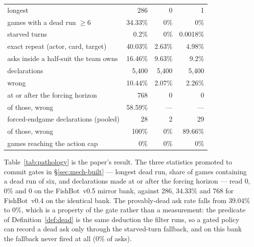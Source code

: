 \documentclass[11pt]{article}
\theoremstyle{definition}
\DeclareRobustCommand{\vfive}{\texorpdfstring{\mbox{FishBot v0.5}}{FishBot v0.5}}
\DeclareRobustCommand{\vfour}{\texorpdfstring{\mbox{FishBot v0.4}}{FishBot v0.4}}
\providecommand{\numFourDeadAsk}{39.04}
\providecommand{\numFourDeadRunGames}{34.33}
\providecommand{\numFourDeadRunLongest}{286}
\providecommand{\numFourDeclWrong}{10.44}
\providecommand{\numFourPostHorizonDecl}{768}
\providecommand{\numFourRepeatAsk}{40.03}
\providecommand{\numFiveRepeatAsk}{2.63}
\providecommand{\numFiveDeadAsk}{0}
\providecommand{\numFiveDeadRunGames}{0}
\providecommand{\numFiveDeadRunLongest}{0}
\providecommand{\numFiveDeclWrong}{2.07}
\providecommand{\numFivePostHorizonDecl}{0}
\providecommand{\numCrossCapRate}{0}
\providecommand{\numCrossDeadRunGames}{0}
\providecommand{\numCrossDeadRunLongest}{1}
\providecommand{\numCrossDeclN}{5{,}400}
\providecommand{\numCrossDeclWrong}{2.26}
\providecommand{\numCrossForced}{29}
\providecommand{\numCrossForcedWrong}{89.66}
\providecommand{\numCrossOwnLocked}{9.2}
\providecommand{\numCrossPostHorizonDecl}{0}
\providecommand{\numCrossRepeatAsk}{4.98}
\providecommand{\numCrossStarved}{0.0018}
\providecommand{\numFiveCapRate}{0}
\providecommand{\numFiveDeclN}{5{,}400}
\providecommand{\numFiveForced}{2}
\providecommand{\numFiveForcedWrong}{0}
\providecommand{\numFiveOwnLocked}{9.63}
\providecommand{\numFiveStarved}{0}
\providecommand{\numFourCapRate}{0}
\providecommand{\numFourDeclN}{5{,}400}
\providecommand{\numFourForced}{28}
\providecommand{\numFourForcedWrong}{100}
\providecommand{\numFourOwnLocked}{16.46}
\providecommand{\numFourPostHorizonWrong}{58.59}
\providecommand{\numFourStarved}{0.2}
\begin{document}
\begin{table}[t]
\begin{tabular}{lrrr}
\quad longest                          & \numFourDeadRunLongest{} & \numFiveDeadRunLongest{} & \numCrossDeadRunLongest{} \\
games with a dead run $\geq 6$         & \numFourDeadRunGames\% & \numFiveDeadRunGames\% & \numCrossDeadRunGames\% \\
starved turns                          & \numFourStarved\%     & \numFiveStarved\%     & \numCrossStarved\% \\
exact repeat (actor, card, target)     & \numFourRepeatAsk\%   & \numFiveRepeatAsk\%   & \numCrossRepeatAsk\% \\
asks inside a half-suit the team owns & \numFourOwnLocked\%   & \numFiveOwnLocked\%   & \numCrossOwnLocked\% \\
\midrule
declarations                           & \numFourDeclN{}       & \numFiveDeclN{}       & \numCrossDeclN{} \\
\quad wrong                            & \numFourDeclWrong\%   & \numFiveDeclWrong\%   & \numCrossDeclWrong\% \\
at or after the forcing horizon        & \numFourPostHorizonDecl{} & \numFivePostHorizonDecl{} & \numCrossPostHorizonDecl{} \\
\quad of those, wrong                  & \numFourPostHorizonWrong\% & --- & --- \\
forced-endgame declarations (pooled)   & \numFourForced{}      & \numFiveForced{}      & \numCrossForced{} \\
\quad of those, wrong                  & \numFourForcedWrong\% & \numFiveForcedWrong\% & \numCrossForcedWrong\% \\
\midrule
games reaching the action cap          & \numFourCapRate\%     & \numFiveCapRate\%     & \numCrossCapRate\% \\
\bottomrule
\end{tabular}
\end{table}

Table~\ref{tab:pathology} is the paper's result. The three statistics promoted to
commit gates in \S\ref{sec:mech-built} --- longest dead run, share of games
containing a dead run of six, and declarations made at or after the forcing
horizon --- read \numFiveDeadRunLongest{}, \numFiveDeadRunGames\% and
\numFivePostHorizonDecl{} on the \vfive{} mirror bank, against
\numFourDeadRunLongest{}, \numFourDeadRunGames\% and \numFourPostHorizonDecl{}
for \vfour{} on the identical bank. The provably-dead ask rate falls from
\numFourDeadAsk\% to \numFiveDeadAsk\%, which is a property of the gate rather
than a measurement: the predicate of Definition~\ref{def:dead} is the same
deduction the filter runs, so a gated policy can record a dead ask only through
the starved-turn fallback, and on this bank the fallback never fired at all
(\numFiveStarved\% of asks).
\end{document}
